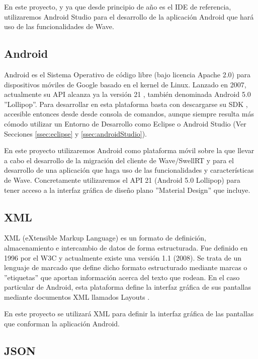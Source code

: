 	En este proyecto, y ya que desde principio de año es el IDE de referencia, utilizaremos Android Studio para el desarrollo de la aplicación Android que hará uso de las funcionalidades de Wave.
    
    \subsection{Android}\label{ssec:android}
    
	Android \cite{ref:android_platform} es el Sistema Operativo de código libre (bajo licencia Apache 2.0) para dispositivos móviles de Google basado en el kernel de Linux. Lanzado en 2007, actualmente su API alcanza ya la versión 21 \cite{ref:android_api21}, también denominada Android 5.0 ''Lollipop''. Para desarrollar en esta plataforma basta con descargarse su SDK \cite{ref:android_sdk}, accesible entonces desde desde consola de comandos, aunque siempre resulta más cómodo utilizar un Entorno de Desarrollo como Eclipse o Android Studio (Ver Secciones \ref{ssec:eclipse} y \ref{ssec:androidStudio}).
	
	En este proyecto utilizaremos Android como plataforma móvil sobre la que llevar a cabo el desarrollo de la migración del cliente de Wave/SwellRT y para el desarrollo de una aplicación que haga uso de las funcionalidades y características de Wave. Concretamente utilizaremos el API 21 (Android 5.0 Lollipop) para tener acceso a la interfaz gráfica de diseño plano ''Material Design'' que incluye.
    
    \subsection{XML}\label{ssec:xml}
    
	XML \cite{ref:xml} (eXtensible Markup Language) es un formato de definición, almacenamiento e intercambio de datos de forma estructurada. Fue definido en 1996 por el W3C y actualmente existe una versión 1.1 (2008). Se trata de un lenguaje de marcado que define dicho formato estructurado mediante marcas o ''etiquetas'' que aportan información acerca del texto que rodean. En el caso particular de Android, esta plataforma define la interfaz gráfica de sus pantallas mediante documentos XML llamados Layouts \cite{ref:android_layout}.
	
	En este proyecto se utilizará XML para definir la interfaz gráfica de las pantallas que conforman la aplicación Android. 
    
    \subsection{JSON}\label{ssec:json}
    
